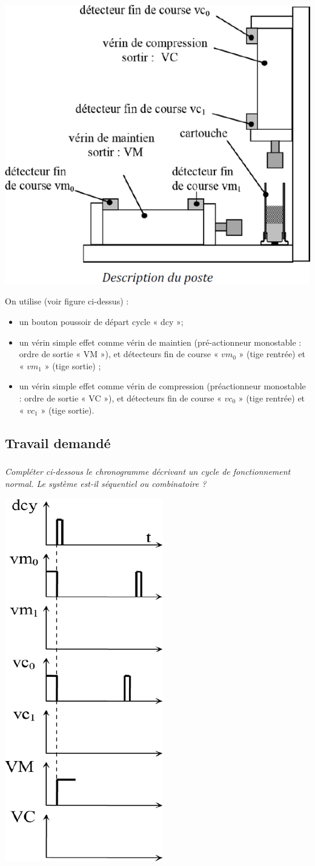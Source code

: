 \documentclass[10pt]{article}
\begin{document}
\begin{center}
\includegraphics[width=.5\textwidth]{images/fig_11}
\end{center}

On utilise (voir figure ci-dessus) :
\begin{itemize}
\item un bouton poussoir de départ cycle « dcy »;
\item un vérin simple effet comme vérin de maintien (pré-actionneur monostable : ordre de sortie
« VM »), et détecteurs fin de course « $vm_0$ » (tige rentrée) et « $vm_1$ » (tige sortie) ;
\item un vérin simple effet comme vérin de compression (préactionneur monostable : ordre de
sortie « VC »), et détecteurs fin de course « $vc_0$ » (tige rentrée) et « $vc_1$ » (tige sortie).
\end{itemize}

\subsection*{Travail demandé}
\subparagraph{}
\textit{Compléter ci-dessous le chronogramme décrivant un cycle de fonctionnement normal. Le
système est-il séquentiel ou combinatoire ?}


\begin{center}
\includegraphics[width=.3\textwidth]{images/fig_12}
\end{center}
\end{document}
